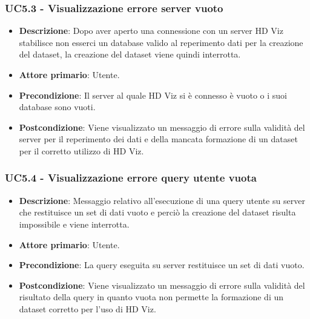\subsubsection{UC5.3 - Visualizzazione errore server vuoto}
\label{ssub:uc5.3}
\begin{itemize}
    \item \textbf{Descrizione}: Dopo aver aperto una connessione con un server HD Viz stabilisce non esserci
                                un database valido al reperimento dati per la creazione del dataset, la creazione
                                del dataset viene quindi interrotta.

    \item \textbf{Attore primario}: Utente.
    
    \item \textbf{Precondizione}:   Il server al quale HD Viz si è connesso è vuoto o i suoi database sono vuoti.

    \item \textbf{Postcondizione}:   Viene visualizzato un messaggio di errore sulla validità del server per il reperimento
                                    dei dati e della mancata formazione di un dataset per il corretto utilizzo di HD Viz.


\end{itemize}


\subsubsection{UC5.4 - Visualizzazione errore query utente vuota}
\label{ssub:uc5.4}
\begin{itemize}
    \item \textbf{Descrizione}: Messaggio relativo all'esecuzione di una query utente su server che restituisce 
                                un set di dati vuoto e
                                perciò la creazione del dataset risulta impossibile e viene interrotta.

    \item \textbf{Attore primario}: Utente.
    
    \item \textbf{Precondizione}:   La query eseguita su server restituisce un set di dati vuoto.

    \item \textbf{Postcondizione}:   Viene visualizzato un messaggio di errore sulla validità del risultato della query 
                                        in quanto vuota non permette la formazione di un dataset corretto per l'uso di HD Viz.

\end{itemize}

